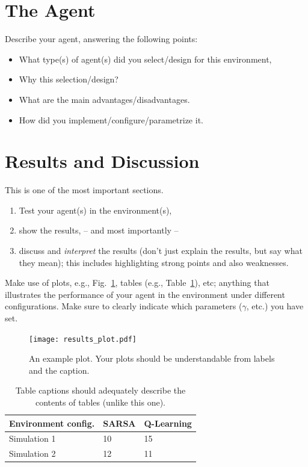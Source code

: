 \documentclass[journal, a4paper]{IEEEtran}
\begin{document}
\section{The Agent}

Describe your agent, answering the following points:
\begin{itemize}
	\item What type(s) of agent(s) did you select/design for this environment, 
	\item Why this selection/design?
	\item What are the main advantages/disadvantages.
	\item How did you implement/configure/parametrize it. 
\end{itemize}

\section{Results and Discussion}

This is one of the most important sections. 
\begin{enumerate}
	\item Test your agent(s) in the environment(s), 
	\item show the results, -- and most importantly -- 
	\item discuss and \emph{interpret} the results (don't just explain the results, but say what they mean); this includes highlighting strong points and also weaknesses.
\end{enumerate}

Make use of plots, e.g., Fig.~\ref{results_figure}, tables (e.g., Table~\ref{results_table}), etc; anything that illustrates the performance of your agent in the environment under different configurations. Make sure to clearly indicate which parameters ($\gamma$, etc.) you have set. 

\begin{figure}[ht]
	\centering
	\texttt{[image: results\_plot.pdf]}
	\caption{\label{results_figure}An example plot. Your plots should be understandable from labels and the caption.}
\end{figure}

\begin{table}[ht]
	\caption{\label{results_table}Table captions should adequately describe the contents of tables (unlike this one).}
	\centering
	\begin{tabular}{lll}
		\hline
		\textbf{Environment config.} & \textbf{SARSA} & \textbf{Q-Learning}  \\
		\hline
		Simulation 1        & 10             & 15 \\
		Simulation 2        & 12             & 11 \\
		\hline
	\end{tabular}
\end{table}
\end{document}
